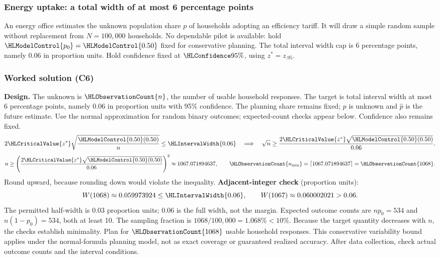 \subsubsection{Energy uptake: a total width of at most 6 percentage points}\label{prob:t3-prop}
An energy office estimates the unknown population share $p$ of households adopting an efficiency tariff. It will draw a simple random sample without replacement from $N=100{,}000$ households. No dependable pilot is available: hold $\HLModelControl{p_0}=\HLModelControl{0.50}$ fixed for conservative planning. The total interval width cap is 6 percentage points, namely 0.06 in proportion units. Hold confidence fixed at $\HLConfidence{95\%}$, using $z^*=z_{.95}$. 
\subsubsection*{Worked solution (C6)}\label{sol:t3-prop}
\textbf{Design.} The unknown is $\HLObservationCount{n}$, the number of usable household responses. The target is total interval width at most 6 percentage points, namely 0.06 in proportion units with 95\% confidence. The planning share remains fixed; $p$ is unknown and $\hat p$ is the future estimate. Use the normal approximation for random binary outcomes; expected-count checks appear below. Confidence also remains fixed. 
\[
2\HLCriticalValue{z^*}\sqrt{\frac{\HLModelControl{0.50}(0.50)}{n}}\le \HLIntervalWidth{0.06}\quad\Longrightarrow\quad\sqrt n\ge\frac{2\HLCriticalValue{z^*}\sqrt{\HLModelControl{0.50}(0.50)}}{0.06}.
\]
\[n\ge\left(\frac{2\HLCriticalValue{z^*}\sqrt{\HLModelControl{0.50}(0.50)}}{0.06}\right)^2\approx1067.071894637,\qquad \HLObservationCount{n_{\min}}=\left\lceil 1067.071894637\right\rceil=\HLObservationCount{1068}.\]
Round upward, because rounding down would violate the inequality.
\textbf{Adjacent-integer check} (proportion units):
\[ W(1068)\approx0.059973924\le \HLIntervalWidth{0.06},\qquad W(1067)\approx0.060002021>0.06.\]
The permitted half-width is $0.03$ proportion units; $0.06$ is the full width, not the margin. Expected outcome counts are $np_0=534$ and $n(1-p_0)=534$, both at least 10. The sampling fraction is $1068/100{,}000=1.068\%<10\%$. Because the target quantity decreases with $n$, the checks establish minimality. Plan for $\HLObservationCount{1068}$ usable household responses. This conservative variability bound applies under the normal-formula planning model, not as exact coverage or guaranteed realized accuracy. After data collection, check actual outcome counts and the interval conditions. 

